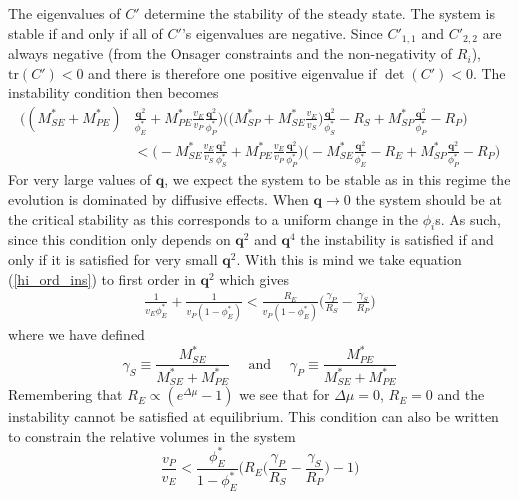 The eigenvalues of $C'$ determine the stability of the steady state. The system is stable if and only if all of $C'$'s eigenvalues are negative. Since $C'_{1,1}$ and $C'_{2,2}$ are always negative (from the Onsager constraints and the non-negativity of $R_i$), $\text{tr}(C') < 0$ and there is therefore one positive eigenvalue if $\det(C')<0$. The instability condition then becomes
\begin{equation}
\begin{split}
    \Bigg((M_{SE}^*+M_{PE}^*)&\frac{\textbf{q}^2}{\phi_E^*} + M_{PE}^*\frac{v_E}{v_P}\frac{\textbf{q}^2}{\phi_P^*}\Bigg)\Bigg(\big(M_{SP}^* + M_{SE}^*\frac{v_E}{v_S}\big)\frac{\textbf{q}^2}{\phi_S^*} - R_S + M_{SP}^*\frac{\textbf{q}^2}{\phi_P^*} - R_P\Bigg) \\
    &< \Bigg(-M_{SE}^*\frac{v_E}{v_S}\frac{\textbf{q}^2}{\phi_S^*} + M_{PE}^*\frac{v_E}{v_P}\frac{\textbf{q}^2}{\phi_P^*}\Bigg)\Bigg(-M_{SE}^*\frac{\textbf{q}^2}{\phi_E^*} - R_E + M_{SP}^*\frac{\textbf{q}^2}{\phi_P^*} - R_P\Bigg)
\end{split}
\label{hi_ord_ins}
\end{equation}
For very large values of $\textbf{q}$, we expect the system to be stable as in this regime the evolution is dominated by diffusive effects. When $\textbf{q} \rightarrow 0$ the system should be at the critical stability as this corresponds to a uniform change in the $\phi_i$s. As such, since this condition only depends on $\textbf{q}^2$ and $\textbf{q}^4$ the instability is satisfied if and only if it is satisfied for very small $\textbf{q}^2$. With this is mind we take equation (\ref{hi_ord_ins}) to first order in $\textbf{q}^2$ which gives
\begin{align}
    \frac{1}{v_E\phi_E^*}+\frac{1}{v_P(1-\phi_E^*)} < \frac{R_E}{v_P(1-\phi_E^*)}\bigg(\frac{\gamma_P}{R_S}-\frac{\gamma_S}{R_P}\bigg)
    \label{eq_form_cond}
\end{align}
where we have defined
\begin{equation}
    \gamma_S \equiv \frac{M_{SE}^*}{M_{SE}^*+M_{PE}^*} \quad \text{   and    } \quad \gamma_P \equiv \frac{M_{PE}^*}{M_{SE}^*+M_{PE}^*}
\end{equation}
Remembering that $R_E \propto (e^{\Delta\mu} - 1)$ we see that for $\Delta\mu=0$, $R_E = 0$ and the instability cannot be satisfied at equilibrium. This condition can also be written to constrain the relative volumes in the system
\begin{equation}
    \frac{v_P}{v_E} < \frac{\phi_E^*}{1-\phi_E^*}\Bigg(R_E\bigg(\frac{\gamma_P}{R_S}-\frac{\gamma_S}{R_P}\bigg) - 1\Bigg)
    \label{vol_ins}
\end{equation}
